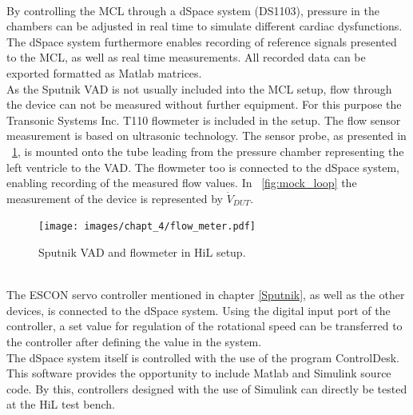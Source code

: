 \\By controlling the MCL through a dSpace system (DS1103), pressure in the chambers can be adjusted in real time to simulate different cardiac dysfunctions. The dSpace system furthermore enables recording of reference signals presented to the MCL, as well as real time measurements. All recorded data can be exported formatted as Matlab matrices.
\\As the Sputnik VAD is not usually included into the MCL setup, flow through the device can not be measured without further equipment. For this purpose the Transonic Systems Inc. T110 flowmeter is included in the setup. The flow sensor measurement is based on ultrasonic technology. The sensor probe, as presented in \figurename~\ref{fig:flow_meter_tube}, is mounted onto the tube leading from the pressure chamber representing the left ventricle to the VAD. The flowmeter too is connected to the dSpace system, enabling recording of the measured flow values. In \figurename~\ref{fig:mock_loop} the measurement of the device is represented by $\dot{V}_{DUT}$.
\begin{figure}[ht]
  \centering
  \texttt{[image: images/chapt\_4/flow\_meter.pdf]}
  \caption[Sputnik VAD and flowmeter in HiL setup]{Sputnik VAD and flowmeter in HiL setup.}
  \label{fig:flow_meter_tube}
\end{figure}
\\The ESCON servo controller mentioned in chapter \ref{Sputnik}, as well as the other devices, is connected to the dSpace system. Using the digital input port of the controller, a set value for regulation of the rotational speed can be transferred to the controller after defining the value in the system.
\\The dSpace system itself is controlled with the use of the program ControlDesk. This software provides the opportunity to include Matlab and Simulink source code. By this, controllers designed with the use of Simulink can directly be tested at the HiL test bench.

